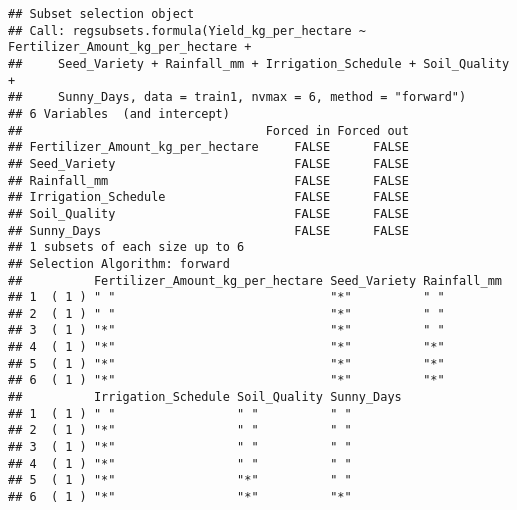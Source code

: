 \documentclass[
]{article}
\begin{document}
\begin{verbatim}
## Subset selection object
## Call: regsubsets.formula(Yield_kg_per_hectare ~ Fertilizer_Amount_kg_per_hectare + 
##     Seed_Variety + Rainfall_mm + Irrigation_Schedule + Soil_Quality + 
##     Sunny_Days, data = train1, nvmax = 6, method = "forward")
## 6 Variables  (and intercept)
##                                  Forced in Forced out
## Fertilizer_Amount_kg_per_hectare     FALSE      FALSE
## Seed_Variety                         FALSE      FALSE
## Rainfall_mm                          FALSE      FALSE
## Irrigation_Schedule                  FALSE      FALSE
## Soil_Quality                         FALSE      FALSE
## Sunny_Days                           FALSE      FALSE
## 1 subsets of each size up to 6
## Selection Algorithm: forward
##          Fertilizer_Amount_kg_per_hectare Seed_Variety Rainfall_mm
## 1  ( 1 ) " "                              "*"          " "        
## 2  ( 1 ) " "                              "*"          " "        
## 3  ( 1 ) "*"                              "*"          " "        
## 4  ( 1 ) "*"                              "*"          "*"        
## 5  ( 1 ) "*"                              "*"          "*"        
## 6  ( 1 ) "*"                              "*"          "*"        
##          Irrigation_Schedule Soil_Quality Sunny_Days
## 1  ( 1 ) " "                 " "          " "       
## 2  ( 1 ) "*"                 " "          " "       
## 3  ( 1 ) "*"                 " "          " "       
## 4  ( 1 ) "*"                 " "          " "       
## 5  ( 1 ) "*"                 "*"          " "       
## 6  ( 1 ) "*"                 "*"          "*"
\end{verbatim}
\end{document}
